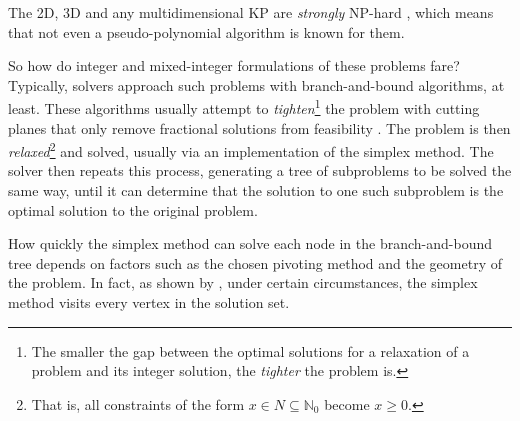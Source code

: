 The 2D, 3D and any multidimensional KP are \emph{strongly} NP-hard \cite{CAPRARA2004,GHOMI2013}, which means that not even a pseudo-polynomial algorithm is known for them.

So how do integer and mixed-integer formulations of these problems fare? Typically, solvers approach such problems with branch-and-bound algorithms, at least. These algorithms usually attempt to \emph{tighten}\footnote{The smaller the gap between the optimal solutions for a relaxation of a problem and its integer solution, the \emph{tighter} the problem is.} the problem with cutting planes that only remove fractional solutions from feasibility \cite{OKTAY2018}. The problem is then \emph{relaxed}\footnote{That is, all constraints of the form $x \in N \subseteq \mathbb{N}_0$ become $x \geq 0$.} and solved, usually via an implementation of the simplex method. The solver then repeats this process, generating a tree of subproblems to be solved the same way, until it can determine that the solution to one such subproblem is the optimal solution to the original problem.

How quickly the simplex method can solve each node in the branch-and-bound tree depends on factors such as the chosen pivoting method and the geometry of the problem. In fact, as shown by \textcite{BERTSIMAS1997}, under certain circumstances, the simplex method visits every vertex in the solution set.